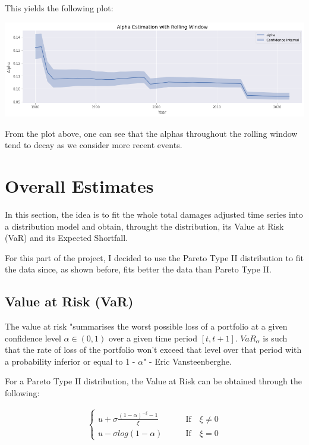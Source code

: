 \documentclass[paper=a4, fontsize=11pt]{scrartcl} %
\begin{document}
This yields the following plot:

\begin{center}
    \includegraphics[scale=0.5]{imgs/alpha_estimation_with_rolling_window.png}
\end{center}

From the plot above, one can see that the alphas throughout the rolling window tend to decay as we consider more recent events.


\section{Overall Estimates}
In this section, the idea is to fit the whole total damages adjusted time series into a distribution model and obtain, throught the distribution, its Value at Risk (VaR) and its Expected Shortfall.

For this part of the project, I decided to use the Pareto Type II distribution to fit the data since, as shown before, fits better the data than Pareto Type II.

\subsection{Value at Risk (VaR)}
The value at risk "summarises the worst possible loss of a portfolio at a given confidence level $\alpha \in (0, 1)$ over a given time period $[t, t+1]$. $VaR_\alpha$ is such that the rate of loss of the portfolio won’t exceed that level over that period with a probability inferior or equal to 1 - $\alpha$" - Eric Vansteenberghe. 

For a Pareto Type II distribution, the Value at Risk can be obtained through the following:

\begin{align*}
    \begin{cases}
        u + \sigma \frac{(1 - \alpha)^{-\xi} - 1}{\xi} \qquad & \text{If} \quad \xi \neq 0  \\
        u - \sigma log(1-\alpha) \qquad & \text{If} \quad \xi = 0
    \end{cases}  
\end{align*}
\end{document}
